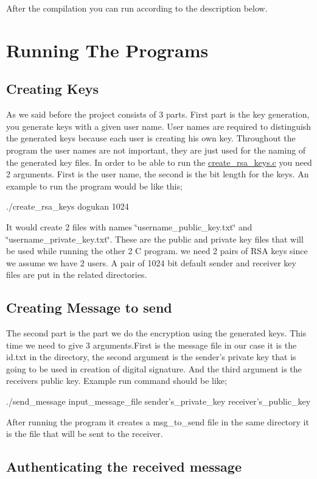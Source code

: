 After the compilation you can run according to the description below.\hypertarget{index_intro3}{}\section{Running The Programs}\label{index_intro3}
\hypertarget{index_sb1}{}\subsection{Creating Keys}\label{index_sb1}
As we said before the project consists of 3 parts. First part is the key generation, you generate keys with a given user name. User names are required to distinguish the generated keys because each user is creating his own key. Throughout the program the user names are not important, they are just used for the naming of the generated key files. In order to be able to run the \hyperlink{create__rsa__keys_8c}{create\-\_\-rsa\-\_\-keys.\-c} you need 2 arguments. First is the user name, the second is the bit length for the keys. An example to run the program would be like this; 
\begin{DoxyCode}
 ./create_rsa_keys dogukan 1024
\end{DoxyCode}
 It would create 2 files with names \char`\"{}username\-\_\-public\-\_\-key.\-txt\char`\"{} and \char`\"{}username\-\_\-private\-\_\-key.\-txt\char`\"{}. These are the public and private key files that will be used while running the other 2 C program. we need 2 pairs of R\-S\-A keys since we assume we have 2 users. A pair of 1024 bit default sender and receiver key files are put in the related directories. \hypertarget{index_sb2}{}\subsection{Creating Message to send}\label{index_sb2}
The second part is the part we do the encryption using the generated keys. This time we need to give 3 arguments.\-First is the message file in our case it is the id.\-txt in the directory, the second argument is the sender's private key that is going to be used in creation of digital signature. And the third argument is the receivers public key. Example run command should be like; 
\begin{DoxyCode}
 ./send_message input_message_file sender's_private_key receiver's_public_key
\end{DoxyCode}
 After running the program it creates a msg\-\_\-to\-\_\-send file in the same directory it is the file that will be sent to the receiver. \hypertarget{index_sb3}{}\subsection{Authenticating the received message}\label{index_sb3}
